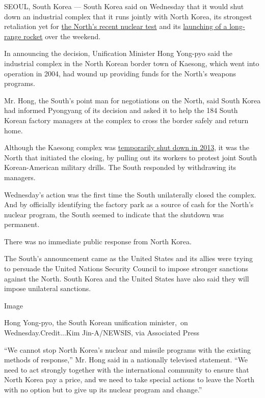 SEOUL, South Korea --- South Korea said on Wednesday that it would shut
down an industrial complex that it runs jointly with North Korea, its
strongest retaliation yet for
\href{http://www.nytimes3xbfgragh.onion/2016/01/07/world/asia/north-korea-hydrogen-bomb-q-a.html}{the
North's recent nuclear test} and its
\href{http://www.nytimes3xbfgragh.onion/2016/02/07/world/asia/north-korea-moves-up-rocket-launching-plan.html}{launching
of a long-range rocket} over the weekend.

In announcing the decision, Unification Minister Hong Yong-pyo said the
industrial complex in the North Korean border town of Kaesong, which
went into operation in 2004, had wound up providing funds for the
North's weapons programs.

Mr. Hong, the South's point man for negotiations on the North, said
South Korea had informed Pyongyang of its decision and asked it to help
the 184 South Korean factory managers at the complex to cross the border
safely and return home.

Although the Kaesong complex was
\href{http://www.nytimes3xbfgragh.onion/2013/04/09/world/asia/north-korea.html}{temporarily
shut down in 2013}, it was the North that initiated the closing, by
pulling out its workers to protest joint South Korean-American military
drills. The South responded by withdrawing its managers.

Wednesday's action was the first time the South unilaterally closed the
complex. And by officially identifying the factory park as a source of
cash for the North's nuclear program, the South seemed to indicate that
the shutdown was permanent.

There was no immediate public response from North Korea.

The South's announcement came as the United States and its allies were
trying to persuade the United Nations Security Council to impose
stronger sanctions against the North. South Korea and the United States
have also said they will impose unilateral sanctions.

Image

Hong Yong-pyo, the South Korean unification minister,~on
Wednesday.Credit...Kim Jin-A/NEWSIS, via Associated Press

``We cannot stop North Korea's nuclear and missile programs with the
existing methods of response,'' Mr. Hong said in a nationally televised
statement. ``We need to act strongly together with the international
community to ensure that North Korea pay a price, and we need to take
special actions to leave the North with no option but to give up its
nuclear program and change.''

